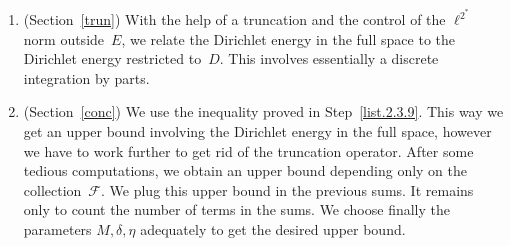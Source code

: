 \documentclass[AHL, Unicode, longabstracts, published]{cedram}
\newcommand{\cF}{\mathcal{F}}
\begin{document}
\begin{enumerate}
\item \label{list.2.3.8}(Section~\ref{trun}) With the help of a truncation and the control of the $\ell^{2^*}$ norm outside~$E$, we relate the Dirichlet energy in the full space to the Dirichlet energy restricted to~$D$. This involves essentially a discrete integration by parts.

\item \label{list.2.3.9}(Section~\ref{conc}) We use the inequality proved in Step~\eqref{list.2.3.9}. This way we get an upper bound involving the Dirichlet energy in the full space, however we have to work further to get rid of the truncation operator. After some tedious computations, we obtain an upper bound depending only on the collection~$\cF$. We plug this upper bound in the previous sums. It remains only to count the number of terms in the sums. We choose finally the parameters $M,\delta,\eta$ adequately to get the desired upper bound.
\end{enumerate}
\end{document}
